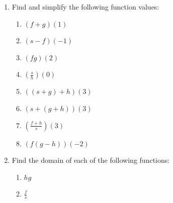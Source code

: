\documentclass{ximera}
\begin{document}
\begin{example}
\begin{itemize}
\begin{image}
\end{image}

\end{itemize}


\begin{enumerate}

\item  \label{funcarithfindvaluesex} Find and simplify the following function values:

\begin{enumerate}

\item  $(f+g)(1)$ 

\item $(s-f)(-1)$ 

\item $(fg)(2)$ 

\item  $\left( \frac{s}{h} \right)(0)$


\item \label{threefunctionsfirstex} $((s+g)+h)(3)$  

\item $(s+(g+h))(3)$  

\item $\left(\frac{f+h}{s}\right)(3)$

\item  \label{threefunctionslastex} $(f(g-h))(-2)$ 

\end{enumerate}

\item  Find the domain of each of the following functions:

\begin{enumerate}

\item $hg$

\item  $\frac{f}{s}$


\end{enumerate}
\end{enumerate}
\end{example}
\end{document}
